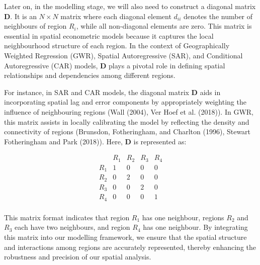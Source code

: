 \documentclass[
  default,
]{sn-jnl}
\begin{document}
Later on, in the modelling stage, we will also need to construct a
diagonal matrix \(\boldsymbol{D}\). It is an \(N \times N\) matrix where
each diagonal element \(d_{ii}\) denotes the number of neighbours of
region \(R_i\), while all non-diagonal elements are zero. This matrix is
essential in spatial econometric models because it captures the local
neighbourhood structure of each region. In the context of Geographically
Weighted Regression (GWR), Spatial Autoregressive (SAR), and Conditional
Autoregressive (CAR) models, \(\boldsymbol{D}\) plays a pivotal role in
defining spatial relationships and dependencies among different regions.

For instance, in SAR and CAR models, the diagonal matrix
\(\boldsymbol{D}\) aids in incorporating spatial lag and error
components by appropriately weighting the influence of neighbouring
regions (Wall (2004), Ver Hoef et al. (2018)). In GWR, this matrix
assists in locally calibrating the model by reflecting the density and
connectivity of regions (Brunsdon, Fotheringham, and Charlton (1996),
Stewart Fotheringham and Park (2018)). Here, \(\boldsymbol{D}\) is
represented as:

\[
\begin{array}{ccccc}
   & R_1 & R_2 & R_3 & R_4 \\
R_1 & 1 & 0 & 0 & 0\\ 
R_2 & 0 & 2 & 0 & 0\\ 
R_3 & 0 & 0 & 2 & 0\\
R_4 & 0 & 0 & 0 & 1\\
\end{array}
\]

This matrix format indicates that region \(R_1\) has one neighbour,
regions \(R_2\) and \(R_3\) each have two neighbours, and region \(R_4\)
has one neighbour. By integrating this matrix into our modelling
framework, we ensure that the spatial structure and interactions among
regions are accurately represented, thereby enhancing the robustness and
precision of our spatial analysis.
\end{document}
